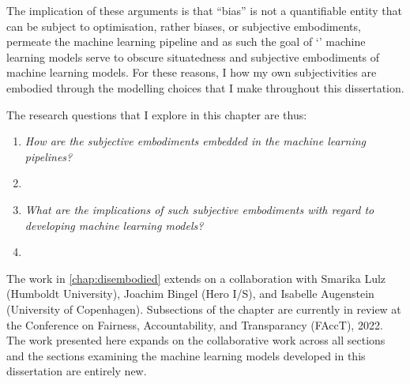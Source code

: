 The implication of these arguments is that ``bias'' is not a quantifiable entity that can be subject to optimisation, rather biases, or subjective embodiments, permeate the machine learning pipeline and as such the goal  of `' machine learning models serve to obscure  situatedness and subjective embodiments of machine learning models.
For these reasons, I  how my own subjectivities are embodied through the modelling choices that I make throughout this dissertation.

The research questions that I explore in this chapter are thus:

\begin{center}
\begin{minipage}{0.9\textwidth}
\vspace{5mm}
    \begin{enumerate}[start=4, label={\textbf{RQ \arabic*}}]
        \item{\textit{How are the subjective embodiments embedded in the machine learning pipelines?}}
        \item{\textit{}}
        \item{\textit{What are the implications of such subjective embodiments with regard to developing machine learning models?}}
        \item{\textit{}}
    \end{enumerate}
\vspace{5mm}
\end{minipage}
\end{center}

The work in \cref{chap:disembodied} extends on a collaboration with Smarika Lulz (Humboldt University), Joachim Bingel (Hero I/S), and Isabelle Augenstein (University of Copenhagen). Subsections of the chapter are currently in review at the Conference on Fairness, Accountability, and Transparancy (FAccT), 2022.
The work presented here expands on the collaborative work across all sections and the sections examining the machine learning models developed in this dissertation are entirely new.


